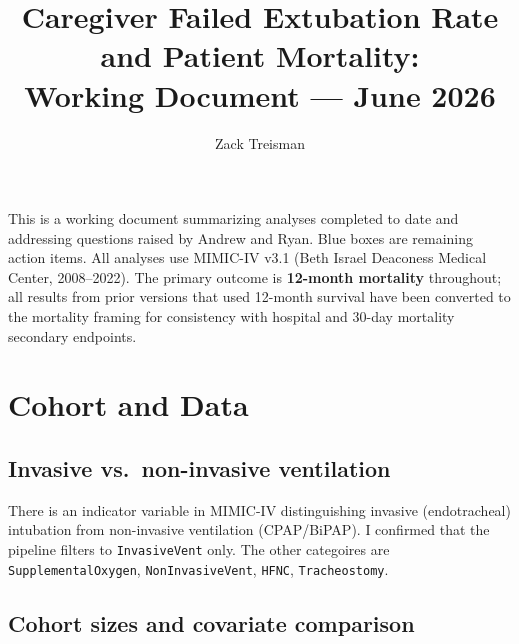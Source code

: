 \documentclass[11pt]{article}
\title{Caregiver Failed Extubation Rate and Patient Mortality:\\
\large Working Document --- June 2026}
\author{Zack Treisman}
\date{}
\begin{document}
\maketitle

\noindent This is a working document summarizing analyses completed to date and addressing questions raised by Andrew and Ryan. Blue boxes are remaining action items. All analyses use MIMIC-IV v3.1 (Beth Israel Deaconess Medical Center, 2008--2022). The primary outcome is \textbf{12-month mortality} throughout; all results from prior versions that used 12-month survival have been converted to the mortality framing for consistency with hospital and 30-day mortality secondary endpoints.

\section{Cohort and Data}

\subsection{Invasive vs.\ non-invasive ventilation}

There is an indicator variable in MIMIC-IV distinguishing invasive
(endotracheal) intubation from non-invasive ventilation (CPAP/BiPAP). I confirmed that the pipeline filters to \texttt{InvasiveVent} only. The other categoires are \texttt{SupplementalOxygen}, \texttt{NonInvasiveVent}, \texttt{HFNC}, \texttt{Tracheostomy}.

\subsection{Cohort sizes and covariate comparison}
\end{document}
